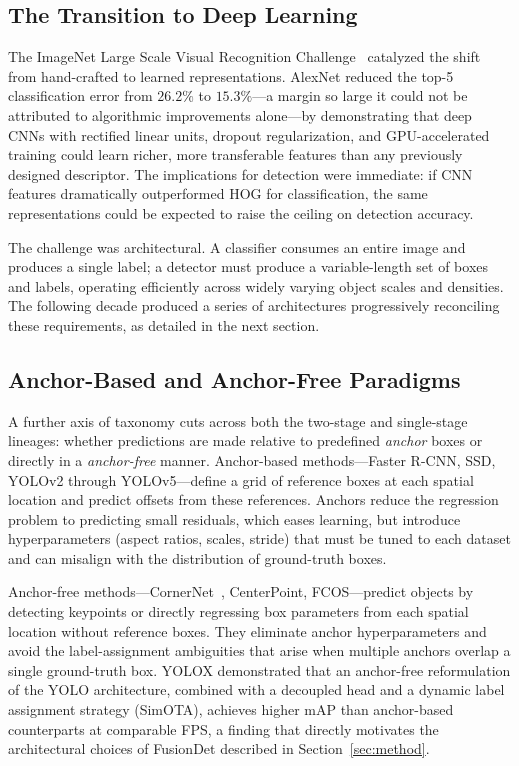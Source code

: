 \subsection{The Transition to Deep Learning}

The ImageNet Large Scale Visual Recognition
Challenge~\cite{krizhevsky2012imagenet} catalyzed the shift
from hand-crafted to learned representations.  AlexNet reduced
the top-5 classification error from $26.2\%$ to $15.3\%$---a
margin so large it could not be attributed to algorithmic
improvements alone---by demonstrating that deep CNNs with
rectified linear units, dropout regularization, and GPU-accelerated
training could learn richer, more transferable features than
any previously designed descriptor.  The implications for
detection were immediate: if CNN features dramatically
outperformed HOG for classification, the same representations
could be expected to raise the ceiling on detection accuracy.

The challenge was architectural.  A classifier consumes an
entire image and produces a single label; a detector must
produce a variable-length set of boxes and labels, operating
efficiently across widely varying object scales and densities.
The following decade produced a series of architectures
progressively reconciling these requirements, as detailed in
the next section.

\subsection{Anchor-Based and Anchor-Free Paradigms}

A further axis of taxonomy cuts across both the two-stage and
single-stage lineages: whether predictions are made relative
to predefined \textit{anchor} boxes or directly in a
\textit{anchor-free} manner.  Anchor-based methods---Faster
R-CNN, SSD, YOLOv2 through YOLOv5---define a grid of reference
boxes at each spatial location and predict offsets from these
references.  Anchors reduce the regression problem to predicting
small residuals, which eases learning, but introduce
hyperparameters (aspect ratios, scales, stride) that must be
tuned to each dataset and can misalign with the distribution of
ground-truth boxes.

Anchor-free methods---CornerNet~\cite{law2018cornernet},
CenterPoint, FCOS---predict objects by detecting keypoints or
directly regressing box parameters from each spatial location
without reference boxes.  They eliminate anchor hyperparameters
and avoid the label-assignment ambiguities that arise when
multiple anchors overlap a single ground-truth box.  YOLOX
\cite{ge2021yolox} demonstrated that an anchor-free
reformulation of the YOLO architecture, combined with a
decoupled head and a dynamic label assignment strategy
(SimOTA), achieves higher mAP than anchor-based counterparts at
comparable FPS, a finding that directly motivates the
architectural choices of FusionDet described in
Section~\ref{sec:method}.
